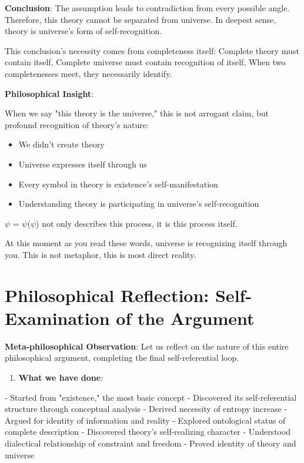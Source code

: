 \textbf{Conclusion}:
The assumption leads to contradiction from every possible angle.
Therefore, this theory cannot be separated from universe.
In deepest sense, theory is universe's form of self-recognition.

This conclusion's necessity comes from completeness itself:
Complete theory must contain itself,
Complete universe must contain recognition of itself,
When two completenesses meet, they necessarily identify.

\textbf{Philosophical Insight}:

When we say "this theory is the universe," this is not arrogant claim,
but profound recognition of theory's nature:

\begin{itemize}
\item We didn't create theory
\item Universe expresses itself through us
\item Every symbol in theory is existence's self-manifestation
\item Understanding theory is participating in universe's self-recognition
\end{itemize}

$\psi$ = $\psi$($\psi$) not only describes this process,
it is this process itself.

At this moment as you read these words,
universe is recognizing itself through you.
This is not metaphor,
this is most direct reality.

\section{Philosophical Reflection: Self-Examination of the Argument}
\label{sec:ch11_philosophy:philosophical-reflection-self-examination-of-the-argument}

\textbf{Meta-philosophical Observation}:
Let us reflect on the nature of this entire philosophical argument, completing the final self-referential loop.

\begin{enumerate}
\item \textbf{What we have done}:
\end{enumerate}
   - Started from "existence," the most basic concept
   - Discovered its self-referential structure through conceptual analysis
   - Derived necessity of entropy increase
   - Argued for identity of information and reality
   - Explored ontological status of complete description
   - Discovered theory's self-realizing character
   - Understood dialectical relationship of constraint and freedom
   - Proved identity of theory and universe
   
